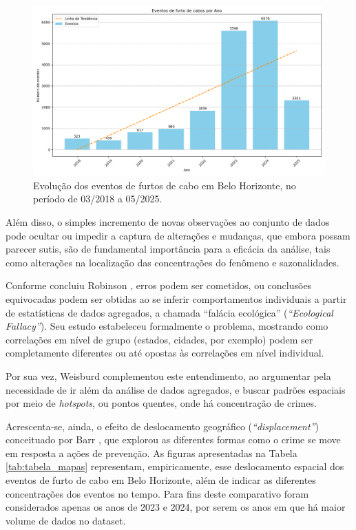 \begin{figure}[!htb]
  \captionsetup{singlelinecheck=false}
  \centering
  \includegraphics[scale=0.5,keepaspectratio]{dados/images/grafico_barras_ocorrencias_ano.png}
  \caption{Evolução dos eventos de furtos de cabo em Belo Horizonte, no período de 03/2018 a 05/2025.}
  \label{fig:grafico_barras_ocorrencias_ano}
\end{figure}

Além disso, o simples incremento de novas observações ao conjunto de dados pode ocultar ou impedir a captura de alterações e mudanças, que embora possam parecer sutis, são de fundamental importância para a eficácia da análise, tais como alterações na localização das concentrações do fenômeno e sazonalidades. 

Conforme concluiu Robinson \cite{Robinson1950}, erros podem ser cometidos, ou conclusões equivocadas podem ser obtidas ao se inferir comportamentos individuais a partir de estatísticas de dados agregados, a chamada ``falácia ecológica'' (\textit{``Ecological Fallacy''}). Seu estudo estabeleceu formalmente o problema, mostrando como correlações em nível de grupo (estados, cidades, por exemplo) podem ser completamente diferentes ou até opostas às correlações em nível individual.

Por sua vez, Weisburd \cite{Weisburd2015} complementou este entendimento, ao argumentar pela necessidade de ir além da análise de dados agregados, e buscar padrões espaciais por meio de \textit{hotspots}, ou pontos quentes, onde há concentração de crimes. 

Acrescenta-se, ainda, o efeito de deslocamento geográfico (\textit{``displacement''}) conceituado por Barr \cite{Barr1990}, que explorou as diferentes formas como o crime se move em resposta a ações de prevenção. As figuras apresentadas na Tabela \ref{tab:tabela_mapas} representam, empiricamente, esse deslocamento espacial dos eventos de furto de cabo em Belo Horizonte, além de indicar as diferentes concentrações dos eventos no tempo. Para fins deste comparativo foram considerados apenas os anos de 2023 e 2024, por serem os anos em que há maior volume de dados no dataset.

